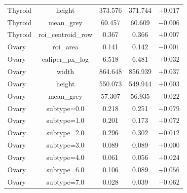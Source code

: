 \begin{table}[H]
\begin{tabular}{lcccc}
Thyroid & height & 373.576 & 371.744 & $+0.017$ \\
Thyroid & mean\_grey & 60.457 & 60.609 & $-0.006$ \\
Thyroid & roi\_centroid\_row & 0.367 & 0.366 & $+0.007$ \\
Ovary & roi\_area & 0.141 & 0.142 & $-0.001$ \\
Ovary & caliper\_px\_log & 6.518 & 6.481 & $+0.032$ \\
Ovary & width & 864.648 & 856.939 & $+0.037$ \\
Ovary & height & 550.073 & 549.944 & $+0.003$ \\
Ovary & mean\_grey & 57.307 & 56.935 & $+0.022$ \\
Ovary & subtype=0.0 & 0.218 & 0.251 & $-0.079$ \\
Ovary & subtype=1.0 & 0.201 & 0.173 & $+0.072$ \\
Ovary & subtype=2.0 & 0.296 & 0.302 & $-0.012$ \\
Ovary & subtype=3.0 & 0.089 & 0.089 & $+0.000$ \\
Ovary & subtype=4.0 & 0.061 & 0.056 & $+0.024$ \\
Ovary & subtype=6.0 & 0.106 & 0.089 & $+0.056$ \\
Ovary & subtype=7.0 & 0.028 & 0.039 & $-0.062$ \\
\bottomrule\end{tabular}
\end{table}
